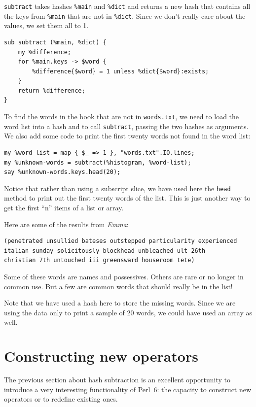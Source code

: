 {\tt subtract} takes hashes \verb'%main' and \verb'%dict' and 
returns a new hash that contains all the keys from \verb'%main' 
that are not in \verb'%dict'.  Since we don't really care about 
the values, we set them all to 1.

\begin{verbatim}
sub subtract (%main, %dict) {
	my %difference;
	for %main.keys -> $word {
		%difference{$word} = 1 unless %dict{$word}:exists;
	}
	return %difference;
}
\end{verbatim}
%
To find the words in the book that are not in {\tt words.txt},
we need to load the word list into a hash and to call 
{\tt subtract}, passing the two hashes as arguments. We also 
add some code to print the first twenty words not found in the 
word list:

\begin{verbatim}
my %word-list = map { $_ => 1 }, "words.txt".IO.lines;
my %unknown-words = subtract(%histogram, %word-list);
say %unknown-words.keys.head(20);
\end{verbatim}
%
Notice that rather than using a subscript slice, we have used 
here the {\tt head} method to print out the first twenty words of 
the list. This is just another way to get the first ``n'' items 
of a list or array.

Here are some of the results from {\em Emma}:

\begin{verbatim}
(penetrated unsullied bateses outstepped particularity experienced 
italian sunday solicitously blockhead unbleached ult 26th 
christian 7th untouched iii greensward houseroom tete)
\end{verbatim}
%
Some of these words are names and possessives.  Others are rare 
or no longer in common use.  But a few are common
words that should really be in the list!

Note that we have used a hash here to store the missing words. 
Since we are using the data only to print a sample of 20 words, 
we could have used an array as well.

\section{Constructing new operators}

\label{operator_construction}

The previous section about hash subtraction is an excellent 
opportunity to introduce a very interesting functionality of 
Perl~6: the capacity to construct new operators or to 
redefine existing ones.


